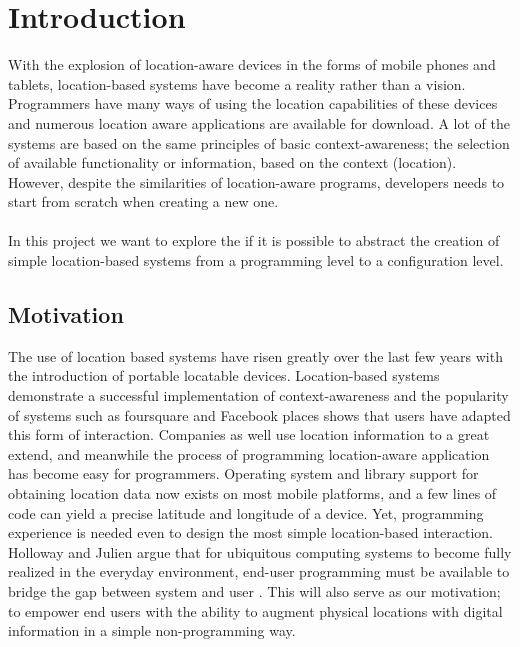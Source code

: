 
\section{Introduction}
\label{sec.introduction}
With the explosion of location-aware devices in the forms of mobile phones and tablets, location-based systems have become a reality rather than a vision. Programmers have many ways of using the location capabilities of these devices and numerous location aware applications are available for download. A lot of the systems are based on the same principles of basic context-awareness; the selection of available functionality or information, based on the context (location). However, despite the similarities of location-aware programs, developers needs to start from scratch when creating a new one. 
\\\\
In this project we want to explore the if it is possible to abstract the creation of simple location-based systems from a programming level to a configuration level.


\subsection{Motivation} %
\label{sub:context_and_motivation}
The use of location based systems have risen greatly over the last few years with the introduction of portable locatable devices. Location-based systems demonstrate a successful implementation of context-awareness and the popularity of systems such as foursquare and Facebook places shows that users have adapted this form of interaction. Companies as well use location information to a great extend, and meanwhile the process of programming location-aware application has become easy for programmers. Operating system and library support for obtaining location data now exists on most mobile platforms, and a few lines of code can yield a precise latitude and longitude of a device. Yet, programming experience is needed even to design the most simple location-based interaction. Holloway and Julien argue that for ubiquitous computing systems to become fully realized in the everyday environment, end-user programming must be available to bridge the gap between system and user \cite{Holloway:2010:CEP:1882362.1882398}. This will also serve as our motivation; to empower end users with the ability to augment physical locations with digital information in a simple non-programming way.

